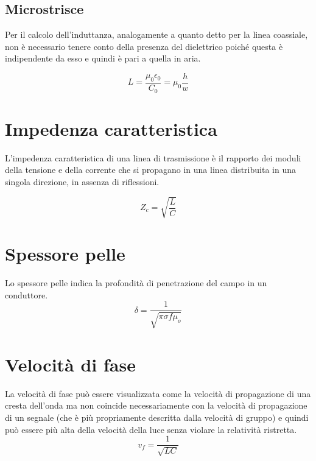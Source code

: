 \documentclass[10pt,a4paper]{report}
\begin{document}
		\subsection{Microstrisce}
			
			Per il calcolo dell’induttanza, analogamente a quanto detto per la linea coassiale, non è necessario tenere conto della presenza del dielettrico
			poiché questa è indipendente da esso e quindi è pari a quella in aria.
		
			\begin{equation}
				L=\frac{\mu_0 \epsilon_0}{C_0}=\mu_0 \frac{h}{w}
			\end{equation}
	


	\section{Impedenza caratteristica}

			L'impedenza caratteristica di una linea di trasmissione è il rapporto dei moduli della tensione e della corrente che si propagano in una linea distribuita in una singola direzione, in assenza di riflessioni.

			\begin{equation}
				Z_c=\sqrt{\frac{L}{C}}
			\end{equation}

	\section{Spessore pelle}
			Lo spessore pelle indica la profondità di penetrazione del campo in un conduttore.
			\begin{equation}
			\delta=\frac{1}{	\sqrt{\pi \sigma f \mu_o}}
			\end{equation}

	\section{Velocità di fase}
			 La velocità di fase può essere visualizzata come la velocità di propagazione di una cresta dell'onda ma non coincide necessariamente con la velocità di propagazione di un segnale (che è più propriamente descritta dalla velocità di gruppo) e quindi può essere più alta della velocità della luce senza violare la relatività ristretta.
			\begin{equation}
				v_f=\frac{1}{\sqrt{LC}}
			\end{equation}
\end{document}
